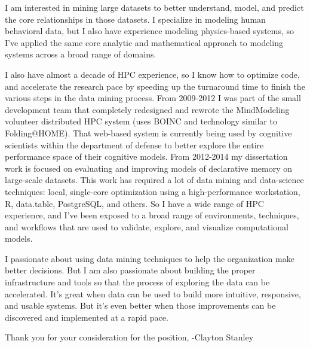 \documentclass{article}
\begin{document}
I am interested in mining large datasets to better understand, model, and predict the core relationships in those datasets.
I specialize in modeling human behavioral data, but I also have experience modeling physics-based systems,
so I've applied the same core analytic and mathematical approach to modeling systems across a broad range of domains.

I also have almost a decade of HPC experience, so I know how to optimize code, and accelerate the research pace by speeding up the turnaround time to finish the various steps in the data mining process. 
From 2009-2012 I was part of the small development team that completely redesigned and rewrote the MindModeling volunteer distributed HPC system (uses BOINC and technology similar to Folding@HOME).
That web-based system is currently being used by cognitive scientists within the department of defense to better explore the entire performance space of their cognitive models.
From 2012-2014 my dissertation work is focused on evaluating and improving models of declarative memory on large-scale datasets.
This work has required a lot of data mining and data-science techniques: local, single-core optimization using a high-performance workstation, R, data.table, PostgreSQL, and others.
So I have a wide range of HPC experience, and I've been exposed to a broad range of environments, techniques, and workflows that are used to validate, explore, and visualize computational models.

I passionate about using data mining techniques to help the organization make better decisions.
But I am also passionate about building the proper infrastructure and tools so that the process of exploring the data can be accelerated.
It's great when data can be used to build more intuitive, responsive, and usable systems.
But it's even better when those improvements can be discovered and implemented at a rapid pace.

Thank you for your consideration for the position,
-Clayton Stanley
\end{document}
